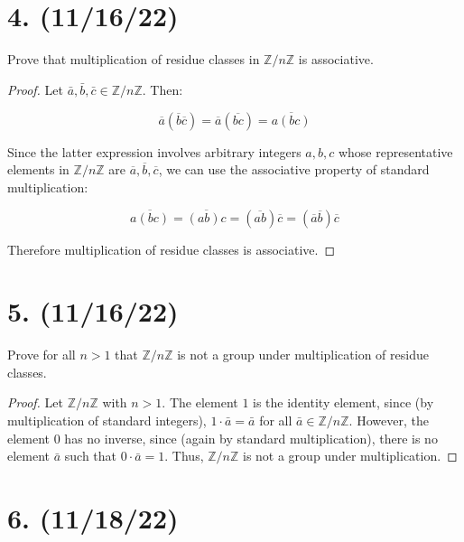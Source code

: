 \documentclass{article}
\begin{document}
\section*{4. (11/16/22)}

Prove that multiplication of residue classes in $\mathbb{Z}/n\mathbb{Z}$ is associative.

\begin{proof}
      Let $\bar{a}, \bar{b}, \bar{c} \in \mathbb{Z}/n\mathbb{Z}$. Then:

      \begin{equation*}
            \overline{a}(\overline{b}\overline{c}) = \overline{a}(\overline{bc}) = \overline{a(bc)}
      \end{equation*}

      Since the latter expression involves arbitrary integers $a, b, c$ whose representative elements in $\mathbb{Z}/n\mathbb{Z}$ are $\overline{a}, \overline{b}, \overline{c}$, we can use the associative property of standard multiplication:

      \begin{equation*}
            \overline{a(bc)} = \overline{(ab)c} = (\overline{ab})\overline{c} = (\overline{a}\overline{b})\overline{c} 
      \end{equation*}

      Therefore multiplication of residue classes is associative.
\end{proof}

\section*{5. (11/16/22)}

Prove for all $n > 1$ that $\mathbb{Z}/n\mathbb{Z}$ is not a group under multiplication of residue classes.

\begin{proof}
      Let $\mathbb{Z}/n\mathbb{Z}$ with $n > 1$. The element $1$ is the identity element, since (by multiplication of standard integers), $1 \cdot \bar{a} = \bar{a}$ for all $\bar{a} \in \mathbb{Z}/n\mathbb{Z}$. However, the element $0$ has no inverse, since (again by standard multiplication), there is no element $\bar{a}$ such that $0 \cdot \bar{a} = 1$. Thus, $\mathbb{Z}/n\mathbb{Z}$ is not a group under multiplication.
\end{proof}

\section*{6. (11/18/22)}
\end{document}
